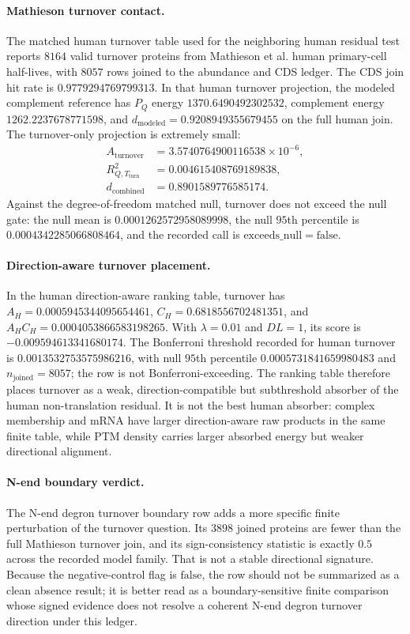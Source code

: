 \paragraph{Mathieson turnover contact.}
The matched human turnover table used for the neighboring human residual test reports $8164$ valid turnover proteins from Mathieson et al. human primary-cell half-lives, with $8057$ rows joined to the abundance and CDS ledger. The CDS join hit rate is $0.9779294769799313$. In that human turnover projection, the modeled complement reference has $P_Q$ energy $1370.6490492302532$, complement energy $1262.2237678771598$, and $d_{\mathrm{modeled}}=0.9208949355679455$ on the full human join. The turnover-only projection is extremely small:
$$
\begin{aligned}
A_{\mathrm{turnover}} &= 3.5740764900116538\times 10^{-6},\\
R^2_{Q,T_{\mathrm{turn}}} &= 0.004615408769189838,\\
d_{\mathrm{combined}} &= 0.8901589776585174.
\end{aligned}
$$
Against the degree-of-freedom matched null, turnover does not exceed the null gate: the null mean is $0.0001262572958089998$, the null $95$th percentile is $0.0004342285066808464$, and the recorded call is $\mathrm{exceeds\_null}=\mathrm{false}$.

\paragraph{Direction-aware turnover placement.}
In the human direction-aware ranking table, turnover has $A_H=0.0005945344095654461$, $C_H=0.6818556702481351$, and $A_HC_H=0.0004053866583198265$. With $\lambda=0.01$ and $DL=1$, its score is $-0.009594613341680174$. The Bonferroni threshold recorded for human turnover is $0.0013532753575986216$, with null $95$th percentile $0.0005731841659980483$ and $n_{\mathrm{joined}}=8057$; the row is not Bonferroni-exceeding. The ranking table therefore places turnover as a weak, direction-compatible but subthreshold absorber of the human non-translation residual. It is not the best human absorber: complex membership and mRNA have larger direction-aware raw products in the same finite table, while PTM density carries larger absorbed energy but weaker directional alignment.

\paragraph{N-end boundary verdict.}
The N-end degron turnover boundary row adds a more specific finite perturbation of the turnover question. Its $3898$ joined proteins are fewer than the full Mathieson turnover join, and its sign-consistency statistic is exactly $0.5$ across the recorded model family. That is not a stable directional signature. Because the negative-control flag is $\mathrm{false}$, the row should not be summarized as a clean absence result; it is better read as a boundary-sensitive finite comparison whose signed evidence does not resolve a coherent N-end degron turnover direction under this ledger.

